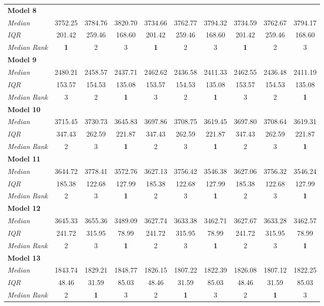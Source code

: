 \documentclass[fleqn,usenatbib]{mnras}
\begin{document}
\begin{table}
\begin{tabular}{@{\extracolsep{3pt}}lccccccccc@{}}
    \textbf{Model 8} & & & & & & & & & \\
    \emph{Median} & 3752.25 & 3784.76 & 3820.70 & 3734.66 & 3762.77 & 3794.32 & 3734.59 & 3762.67 & 3794.17 \\
    \emph{IQR} & 201.42 & 259.46 & 168.60 & 201.42 & 259.46 & 168.60 & 201.42 & 259.46 & 168.60 \\
    \emph{Median Rank} & \textbf{1} & 2 & 3 & \textbf{1} & 2 & 3 & \textbf{1} & 2 & 3 \\\hline
    \textbf{Model 9} & & & & & & & & & \\
    \emph{Median} & 2480.21 & 2458.57 & 2437.71 & 2462.62 & 2436.58 & 2411.33 & 2462.55 & 2436.48 & 2411.19 \\
    \emph{IQR} & 153.57 & 154.53 & 135.08 & 153.57 & 154.53 & 135.08 & 153.57 & 154.53 & 135.08 \\
    \emph{Median Rank} & 3 & 2 & \textbf{1} & 3 & 2 & \textbf{1} & 3 & 2 & \textbf{1} \\\hline
    \textbf{Model 10} & & & & & & & & & \\
    \emph{Median} & 3715.45 & 3730.73 & 3645.83 & 3697.86 & 3708.75 & 3619.45 & 3697.80 & 3708.64 & 3619.31 \\
    \emph{IQR} & 347.43 & 262.59 & 221.87 & 347.43 & 262.59 & 221.87 & 347.43 & 262.59 & 221.87 \\
    \emph{Median Rank} & 2 & 3 & \textbf{1} & 2 & 3 & \textbf{1} & 2 & 3 & \textbf{1} \\\hline
    \textbf{Model 11} & & & & & & & & & \\
    \emph{Median} & 3644.72 & 3778.41 & 3572.76 & 3627.13 & 3756.42 & 3546.38 & 3627.06 & 3756.32 & 3546.24 \\
    \emph{IQR} & 185.38 & 122.68 & 127.99 & 185.38 & 122.68 & 127.99 & 185.38 & 122.68 & 127.99 \\
    \emph{Median Rank} & 2 & 3 & \textbf{1} & 2 & 3 & \textbf{1} & 2 & 3 & \textbf{1} \\\hline
    \textbf{Model 12} & & & & & & & & & \\
    \emph{Median} & 3645.33 & 3655.36 & 3489.09 & 3627.74 & 3633.38 & 3462.71 & 3627.67 & 3633.28 & 3462.57 \\
    \emph{IQR} & 241.72 & 315.95 & 78.99 & 241.72 & 315.95 & 78.99 & 241.72 & 315.95 & 78.99 \\
    \emph{Median Rank} & 2 & 3 & \textbf{1} & 2 & 3 & \textbf{1} & 2 & 3 & \textbf{1} \\\hline
    \textbf{Model 13} & & & & & & & & & \\
    \emph{Median} & 1843.74 & 1829.21 & 1848.77 & 1826.15 & 1807.22 & 1822.39 & 1826.08 & 1807.12 & 1822.25 \\
    \emph{IQR} & 48.46 & 31.59 & 85.03 & 48.46 & 31.59 & 85.03 & 48.46 & 31.59 & 85.03 \\
    \emph{Median Rank} & 2 & \textbf{1} & 3 & 2 & \textbf{1} & 3 & 2 & \textbf{1} & 3 \\\hline
    \end{tabular}
\label{tab:icdouble}
\end{table}
\end{document}
